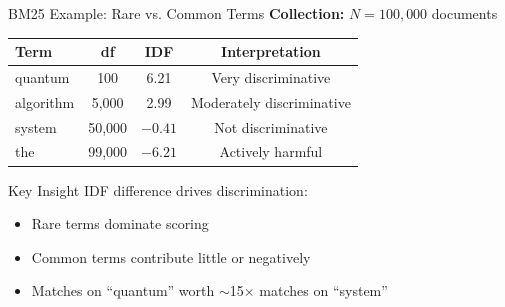 \documentclass[aspectratio=169]{beamer}
\begin{document}
\begin{frame}{BM25 Example: Rare vs. Common Terms}
\textbf{Collection:} $N = 100{,}000$ documents

\vspace{1em}

\begin{table}
\centering
\begin{tabular}{lccc}
\toprule
\textbf{Term} & \textbf{df} & \textbf{IDF} & \textbf{Interpretation} \\
\midrule
quantum & 100 & 6.21 & Very discriminative \\
algorithm & 5{,}000 & 2.99 & Moderately discriminative \\
system & 50{,}000 & $-0.41$ & Not discriminative \\
the & 99{,}000 & $-6.21$ & Actively harmful \\
\bottomrule
\end{tabular}
\end{table}

\vspace{1em}

\begin{block}{Key Insight}
IDF difference drives discrimination:
\begin{itemize}
    \item Rare terms dominate scoring
    \item Common terms contribute little or negatively
    \item Matches on ``quantum'' worth $\sim$15$\times$ matches on ``system''
\end{itemize}
\end{block}
\end{frame}
\end{document}
